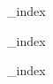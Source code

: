 \documentclass[a4paper,12pt]{article}
\begin{document}
{_index}


{_index}


{_index}
\end{document}
